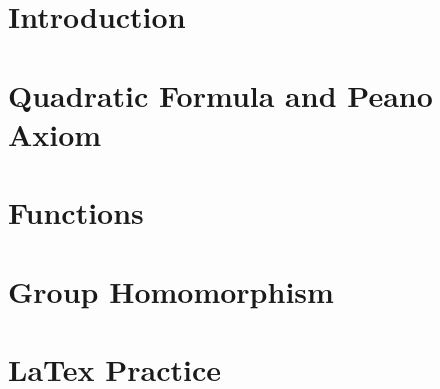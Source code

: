 \documentclass[12pt,openany]{book}
\begin{document}
	
	
	\tableofcontents
	\newpage
	\chapter{Introduction}
	
	
	\newpage
	\chapter{Quadratic Formula and Peano Axiom}
	
	
	\newpage
	\chapter{Functions}
	
	
	\newpage
	\chapter{Group Homomorphism}
	
	
	\newpage
	\chapter*{LaTex Practice}
	
	
	\newpage
	\appendix
	
	
\end{document}
